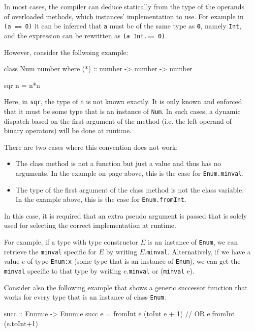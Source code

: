 In most cases, the compiler can deduce statically from the type of the operands of overloaded methods, which instances' implementation to use. For example in \texttt{(a == 0)} it can be inferred that \texttt{a} must be of the same type as \texttt{0}, namely \texttt{Int}, and the expression can be rewritten as \texttt{(a Int.== 0)}.

However, consider the follwoing example: \begin{code}
class Num number where
  (*) :: number -> number -> number

sqr n = n*n
\end{code}

Here, in \texttt{sqr}, the type of \texttt{n} is not known exactly. It is only known and enforced that it must be some type that is an instance of \texttt{Num}. In such cases, a dynamic dispatch based on the first argument of the method (i.e. the left operand of binary operators) will be done at runtime.

There are two cases where this convention does not work:

\begin{itemize}
\item The class method is not a function but just a value and thus has no arguments. In the example on page \pageref{classexample} above, this is the case for \texttt{Enum.minval}.
\item The type of the first argument of the class method is not the class variable. In the example above, this is the case for \texttt{Enum.fromInt}.
\end{itemize}

In this case, it is required that an extra pseudo argument is passed that is solely used for selecting the correct implementation at runtime.

For example, if a type with type constructor $E$ is an instance of \texttt{Enum}, we can retrieve the \texttt{minval} specific for $E$ by writing $E$.\texttt{minval}. Alternatively, if we have a value $e$ of type \texttt{Enum:x} (some type that is an instance of \texttt{Enum}), we can get the \texttt{minval} specific to that type by writing $e$.\texttt{minval} or (\texttt{minval} e).

Consider also the following example that shows a generic successor function that works for every type that is an instance of class \texttt{Enum}:

\begin{code}
succ :: Enum:e -> Enum:e
succ e = fromInt e (toInt e + 1)  // OR e.fromInt (e.toInt+1)
\end{code}

